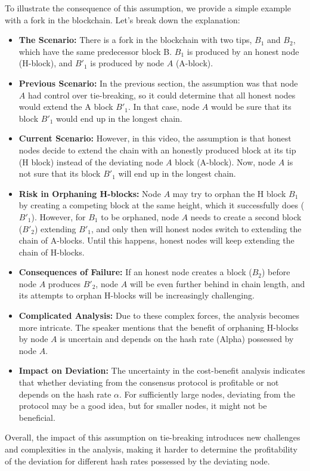 To illustrate the consequence of this assumption, we provide a simple example with a fork in the blockchain. Let's break down the explanation:
\begin{itemize}
    \item \textbf{The Scenario:} There is a fork in the blockchain with two tips, $B_1$ and $B_2$, which have the same predecessor block B. $B_1$ is produced by an honest node (H-block), and $B'_1$ is produced by node $A$ (A-block).
    \item \textbf{Previous Scenario:} In the previous section, the assumption was that node $A$ had control over tie-breaking, so it could determine that all honest nodes would extend the A block $B'_1$. In that case, node $A$ would be sure that its block $B'_1$ would end up in the longest chain.
    \item \textbf{Current Scenario:} However, in this video, the assumption is that honest nodes decide to extend the chain with an honestly produced block at its tip (H block) instead of the deviating node $A$ block (A-block). Now, node $A$ is not sure that its block $B'_1$ will end up in the longest chain.
    \item\textbf{Risk in Orphaning H-blocks:} Node $A$ may try to orphan the H block $B_1$ by creating a competing block at the same height, which it successfully does ($B'_1$). However, for $B_1$ to be orphaned, node $A$ needs to create a second block ($B'_2$) extending $B'_1$, and only then will honest nodes switch to extending the chain of A-blocks. Until this happens, honest nodes will keep extending the chain of H-blocks.
    \item \textbf{Consequences of Failure:} If an honest node creates a block ($B_2$) before node $A$ produces $B'_2$, node $A$ will be even further behind in chain length, and its attempts to orphan H-blocks will be increasingly challenging.
    \item \textbf{Complicated Analysis:} Due to these complex forces, the analysis becomes more intricate. The speaker mentions that the benefit of orphaning H-blocks by node $A$ is uncertain and depends on the hash rate (Alpha) possessed by node $A$.
    \item \textbf{Impact on Deviation:} The uncertainty in the cost-benefit analysis indicates that whether deviating from the consensus protocol is profitable or not depends on the hash rate $\alpha$. For sufficiently large nodes, deviating from the protocol may be a good idea, but for smaller nodes, it might not be beneficial.
\end{itemize}
Overall, the impact of this assumption on tie-breaking introduces new challenges and complexities in the analysis, making it harder to determine the profitability of the deviation for different hash rates possessed by the deviating node. 

